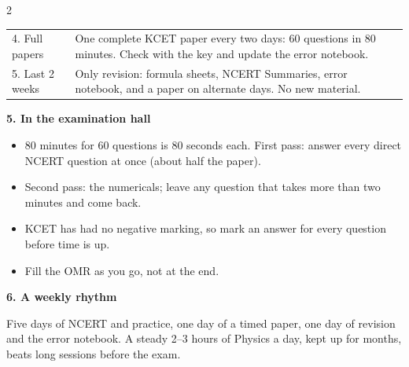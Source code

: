 \begin{multicols}{2}
{\begin{tabularx}{\linewidth}{@{}l>{\raggedright\arraybackslash}X@{}}
4. Full papers & One complete KCET paper every two days: 60 questions in 80 minutes. Check with the key and update the error notebook.\\
5. Last 2 weeks & Only revision: formula sheets, NCERT Summaries, error notebook, and a paper on alternate days. No new material.\\
\bottomrule\end{tabularx}}\par\medskip
\textbf{\color{crimson}5. In the examination hall}\par\smallskip
\begin{itemize}[leftmargin=1.1em,itemsep=2pt,topsep=0pt]
\item 80 minutes for 60 questions is 80 seconds each. First pass: answer every direct NCERT question at once (about half the paper).
\item Second pass: the numericals; leave any question that takes more than two minutes and come back.
\item KCET has had no negative marking, so mark an answer for every question before time is up.
\item Fill the OMR as you go, not at the end.
\end{itemize}\medskip
\textbf{\color{crimson}6. A weekly rhythm}\par\smallskip
{\small Five days of NCERT and practice, one day of a timed paper, one day of revision and the error notebook. A steady 2--3 hours of Physics a day, kept up for months, beats long sessions before the exam.}\par
\end{multicols}
